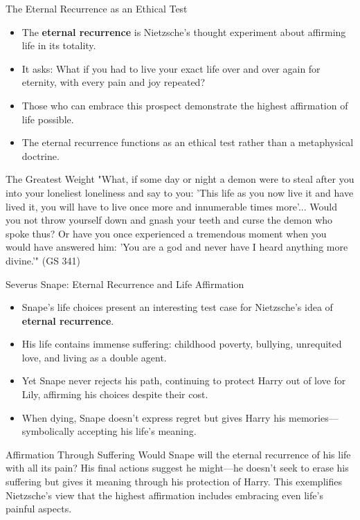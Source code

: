 \documentclass{beamer}
\begin{document}
\begin{frame}{The Eternal Recurrence as an Ethical Test}
\begin{itemize}
\item The \textbf{eternal recurrence} is Nietzsche's thought experiment about affirming life in its totality.
\item It asks: What if you had to live your exact life over and over again for eternity, with every pain and joy repeated?
\item Those who can embrace this prospect demonstrate the highest affirmation of life possible.
\item The eternal recurrence functions as an ethical test rather than a metaphysical doctrine.
\end{itemize}

\begin{exampleblock}{The Greatest Weight}
    \small
"What, if some day or night a demon were to steal after you into your loneliest loneliness and say to you: 'This life as you now live it and have lived it, you will have to live once more and innumerable times more'... Would you not throw yourself down and gnash your teeth and curse the demon who spoke thus? Or have you once experienced a tremendous moment when you would have answered him: 'You are a god and never have I heard anything more divine.'" (GS 341)
\end{exampleblock}
\end{frame}

\begin{frame}{Severus Snape: Eternal Recurrence and Life Affirmation}
    \begin{itemize}
    \item Snape's life choices present an interesting test case for Nietzsche's idea of \textbf{eternal recurrence}.
    \item His life contains immense suffering: childhood poverty, bullying, unrequited love, and living as a double agent.
    \item Yet Snape never rejects his path, continuing to protect Harry out of love for Lily, affirming his choices despite their cost.
    \item When dying, Snape doesn't express regret but gives Harry his memories—symbolically accepting his life's meaning.
    \end{itemize}
    
    \begin{alertblock}{Affirmation Through Suffering}
    Would Snape will the eternal recurrence of his life with all its pain? His final actions suggest he might—he doesn't seek to erase his suffering but gives it meaning through his protection of Harry. This exemplifies Nietzsche's view that the highest affirmation includes embracing even life's painful aspects.
    \end{alertblock}
    \end{frame}
\end{document}
